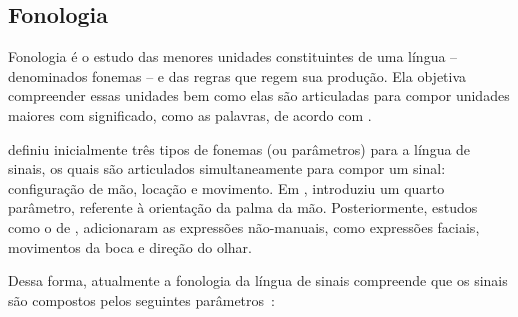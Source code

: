 \subsection{Fonologia}
\label{sec:linguistica-fonologia}

Fonologia é o estudo das menores unidades constituintes de uma língua -- denominados fonemas -- e das regras que regem sua produção. Ela objetiva compreender essas unidades bem como elas são articuladas para compor unidades maiores com significado, como as palavras, de acordo com . 






 definiu inicialmente três tipos de fonemas (ou parâmetros) para a língua de sinais, os quais são articulados simultaneamente para compor um sinal: configuração de mão, locação e movimento. Em \citeyear{battison-1974-phono-deletion}, \citeauthor{battison-1974-phono-deletion} introduziu um quarto parâmetro, referente à orientação da palma da mão. Posteriormente, estudos como o de , adicionaram as expressões não-manuais, como expressões faciais, movimentos da boca e direção do olhar.

Dessa forma, atualmente a fonologia da língua de sinais compreende que os sinais são compostos pelos seguintes parâmetros~\cite{stewart-2021-barrons-asl,jay-2011-dont-just-sign,quadros-2004-estudos-linguisticos}:

